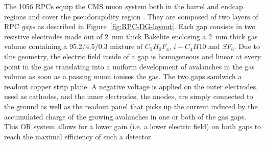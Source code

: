 	The 1056 RPCs equip the CMS muon system both in the barrel and endcap regions and cover the pseudorapidity region . They are composed of two layers of RPC \textit{gaps} as described in Figure~\ref{fig:RPC-DG-layout}. Each gap consists in two resistive electrodes made out of \SI{2}{mm} thick Bakelite enclosing a \SI{2}{mm} thick gas volume containing a 95.2/4.5/0.3 mixture of $C_2H_2F_4$, $i-C_4H10$ and $SF_6$. Due to this geometry, the electric field inside of a gap is homogeneous and linear at every point in the gas translating into a uniform development of avalanches in the gas volume as soon as a passing muon ionises the gas. The two gaps sandwich a readout copper strip plane. A negative voltage is applied on the outer electrodes, used as cathodes, and the inner electrodes, the anodes, are simply connected to the ground as well as the readout panel that picks up the current induced by the accumulated charge of the growing avalanches in one or both of the gas gaps. This OR system allows for a lower gain (i.e. a lower electric field) on both gaps to reach the maximal efficiency of such a detector.
	
\endgroup
	
